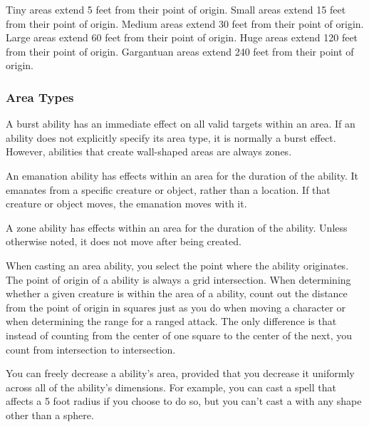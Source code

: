              Tiny areas extend 5 feet from their point of origin.
             Small areas extend 15 feet from their point of origin.
             Medium areas extend 30 feet from their point of origin.
             Large areas extend 60 feet from their point of origin.
             Huge areas extend 120 feet from their point of origin.
             Gargantuan areas extend 240 feet from their point of origin.

        \subsubsection{Area Types}\label{Area Types}

             A burst ability has an immediate effect on all valid targets within an area.
            If an ability does not explicitly specify its area type, it is normally a burst effect.
            However, abilities that create wall-shaped areas are always zones.

             An emanation ability has effects within an area for the duration of the ability.
            It emanates from a specific creature or object, rather than a location.
            If that creature or object moves, the emanation moves with it.

             A zone ability has effects within an area for the duration of the ability.
            Unless otherwise noted, it does not move after being created.

            When casting an area ability, you select the point where the ability originates.
            The point of origin of a ability is always a grid intersection.
            When determining whether a given creature is within the area of a ability, count out the distance from the point of origin in squares just as you do when moving a character or when determining the range for a ranged attack.
            The only difference is that instead of counting from the center of one square to the center of the next, you count from intersection to intersection.

            You can freely decrease a ability's area, provided that you decrease it uniformly across all of the ability's dimensions.
            For example, you can cast a  spell that affects a 5 foot radius if you choose to do so, but you can't cast a  with any shape other than a sphere.

